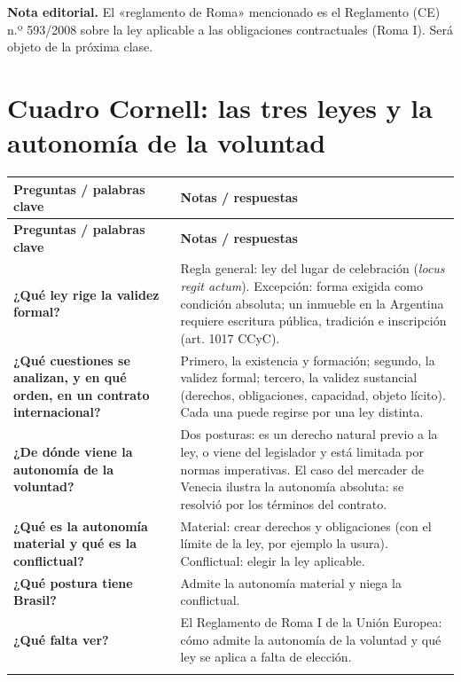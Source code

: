 \documentclass[12pt,oneside]{book}
\makeatletter
\newcommand{\cornellstart}{%
\begin{longtable}{@{}>{\raggedright\arraybackslash}p{0.26\textwidth}%
                  >{\raggedright\arraybackslash}p{\dimexpr0.74\textwidth-2\tabcolsep\relax}@{}}
\toprule
\textbf{Preguntas / palabras clave} & \textbf{Notas / respuestas} \\
\midrule
\endfirsthead
\toprule
\textbf{Preguntas / palabras clave} & \textbf{Notas / respuestas} \\
\midrule
\endhead
}
\newcommand{\cq}[2]{\textbf{#1} & #2 \\[0.6em]}
\newcommand{\cornellend}[1]{%
\midrule
\multicolumn{2}{@{}p{\textwidth}@{}}{\textbf{Resumen:} #1} \\
\bottomrule
\end{longtable}
}
\makeatother
\begin{document}
\begin{note}
\textbf{Nota editorial.} El «reglamento de Roma» mencionado es el Reglamento (CE) n.º 593/2008 sobre la ley aplicable a las obligaciones contractuales (Roma I). Será objeto de la próxima clase.
\end{note}

\section{Cuadro Cornell: las tres leyes y la autonomía de la voluntad}

\cornellstart
\cq{¿Qué ley rige la validez formal?}{Regla general: ley del lugar de celebración (\textit{locus regit actum}). Excepción: forma exigida como condición absoluta; un inmueble en la Argentina requiere escritura pública, tradición e inscripción (art. 1017 CCyC).}
\cq{¿Qué cuestiones se analizan, y en qué orden, en un contrato internacional?}{Primero, la existencia y formación; segundo, la validez formal; tercero, la validez sustancial (derechos, obligaciones, capacidad, objeto lícito). Cada una puede regirse por una ley distinta.}
\cq{¿De dónde viene la autonomía de la voluntad?}{Dos posturas: es un derecho natural previo a la ley, o viene del legislador y está limitada por normas imperativas. El caso del mercader de Venecia ilustra la autonomía absoluta: se resolvió por los términos del contrato.}
\cq{¿Qué es la autonomía material y qué es la conflictual?}{Material: crear derechos y obligaciones (con el límite de la ley, por ejemplo la usura). Conflictual: elegir la ley aplicable.}
\cq{¿Qué postura tiene Brasil?}{Admite la autonomía material y niega la conflictual.}
\cq{¿Qué falta ver?}{El Reglamento de Roma I de la Unión Europea: cómo admite la autonomía de la voluntad y qué ley se aplica a falta de elección.}
\cornellend{El análisis de un contrato internacional debe seguir un orden: primero, si \textbf{existe}; segundo, si cumplió las \textbf{formas} de la ley del lugar de celebración (con excepciones como la escritura pública para inmuebles argentinos); tercero, qué ley rige su \textbf{sustancia}, donde juega la autonomía de la voluntad. Esa autonomía puede entenderse como un derecho natural o como una concesión de la ley, y se divide en material (crear derechos y obligaciones) y conflictual (elegir la ley aplicable), que Brasil no admite.}
\end{document}
